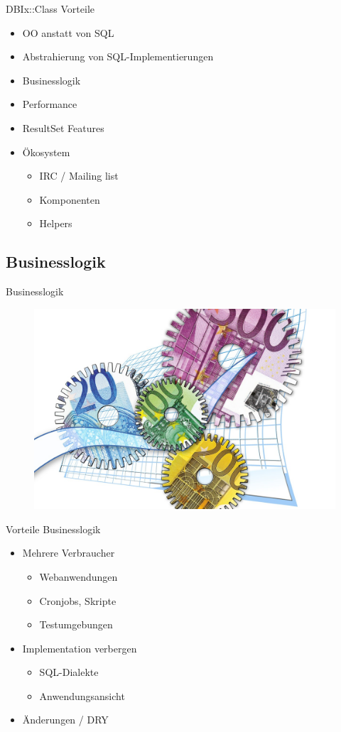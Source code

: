 \begin{frame}[fragile]{DBIx::Class Vorteile}
\begin{itemize}
\item OO anstatt von SQL
\item Abstrahierung von SQL-Implementierungen
\item Businesslogik
\item Performance
\item ResultSet Features
\item Ökosystem
\begin{itemize}
\item IRC / Mailing list
\item Komponenten
\item Helpers
\end{itemize}
\end{itemize}
\end{frame}

\subsection{Businesslogik}
\begin{frame}{Businesslogik}
\begin{figure}[!ht]
\centering
\includegraphics[width=0.75\linewidth]{img/business-logic.jpg}
\end{figure}
\end{frame}

\begin{frame}{Vorteile Businesslogik}
\begin{itemize}
\item Mehrere Verbraucher
\begin{itemize}
\item Webanwendungen
\item Cronjobs, Skripte
\item Testumgebungen
\end{itemize}
\item Implementation verbergen
\begin{itemize}
\item SQL-Dialekte
\item Anwendungsansicht
\end{itemize}
\item Änderungen / DRY
\end{itemize}
\end{frame}

